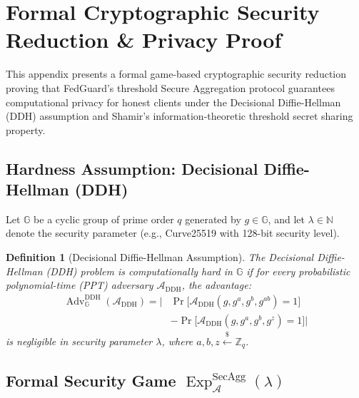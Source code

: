 \newtheorem{definition}{Definition}
\newtheorem{theorem}{Theorem}

\appendices

\section{Formal Cryptographic Security Reduction \& Privacy Proof}
\label{sec:appendix_security_proof}

This appendix presents a formal game-based cryptographic security reduction proving that FedGuard's threshold Secure Aggregation protocol guarantees computational privacy for honest clients under the Decisional Diffie-Hellman (DDH) assumption and Shamir's information-theoretic threshold secret sharing property.

\subsection{Hardness Assumption: Decisional Diffie-Hellman (DDH)}

Let $\mathbb{G}$ be a cyclic group of prime order $q$ generated by $g \in \mathbb{G}$, and let $\lambda \in \mathbb{N}$ denote the security parameter (e.g., Curve25519 with 128-bit security level).

\begin{definition}[Decisional Diffie-Hellman Assumption]
The Decisional Diffie-Hellman (DDH) problem is computationally hard in $\mathbb{G}$ if for every probabilistic polynomial-time (PPT) adversary $\mathcal{A}_{\text{DDH}}$, the advantage:
\begin{equation}
\begin{aligned}
    \operatorname{Adv}_{\mathbb{G}}^{\text{DDH}}(\mathcal{A}_{\text{DDH}}) = \Big| &\operatorname{Pr}\big[ \mathcal{A}_{\text{DDH}}(g, g^a, g^b, g^{ab}) = 1 \big] \\
    &- \operatorname{Pr}\big[ \mathcal{A}_{\text{DDH}}(g, g^a, g^b, g^z) = 1 \big] \Big|
\end{aligned}
\end{equation}
is negligible in security parameter $\lambda$, where $a, b, z \stackrel{\$}{\leftarrow} \mathbb{Z}_q$.
\end{definition}

\subsection{Formal Security Game \texorpdfstring{$\operatorname{Exp}_{\mathcal{A}}^{\text{SecAgg}}(\lambda)$}{Exp\_SecAgg(\lambda)}}


